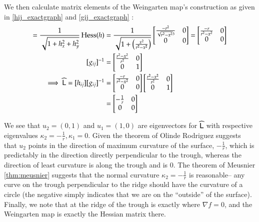   We then calculate matrix elements of the Weingarten map's construction as given in
  \cref{hij_exactgraph} and \cref{gij_exactgraph} :
  \begin{align}
  [h_{ij}] = \frac{1}{\sqrt{1+h_x^2 + h_y^2}} \,  \Hess (h)
     &= \frac{1}{\sqrt{1+\left(\frac{x^2}{r^2-x^2}\right)}}
     \begin{bmatrix}
     \frac{-r^2}{\sqrt{r^2 - x^2}^3} & 0 \\
    0 & 0
     \end{bmatrix} 
     = \begin{bmatrix}
     \frac{-r}{r^2 - x^2} & 0 \\
     0 & 0
     \end{bmatrix} \\
     [g_{ij}]^{-1} &= \begin{bmatrix} \frac{r^2 - x^2}{r^2} & 0 \\ 0 & 1 \end{bmatrix} \\
     \implies \weinmat = [h_{ij}]	[g_{ij}]^{-1} &=
     \begin{bmatrix}
     \frac{-r}{r^2 - x^2} & 0 \\
     0 & 0
     \end{bmatrix} \begin{bmatrix} \frac{r^2 - x^2}{r^2} & 0 \\ 0 & 1 \end{bmatrix} \\
     &= \begin{bmatrix} - \frac{1}{r} & 0 \\ 0 & 0 	\end{bmatrix}	       	
  \end{align}
  
  We see that $u_2 = (0,1)$ and $u_1 = (1,0)$ are eigenvectors for $\widehat{\mathsf{L}}$ with respective eigenvalues
  $\kappa_2 = -\frac{1}{r} , \kappa_1 = 0$. Given the theorem of Olinde Rodriguez suggests that $u_2$ points in the direction of maximum curvature of the surface, $-\frac{1}{r}$, which is predictably in the direction directly perpendicular to the trough, whereas the direction of least curvature is along the trough and is $0$. The theorem of Meusnier \cref{thm:meusnier} suggests that the normal curvature $\kappa_2 = -\frac{1}{r}$ is reasonable-- any curve on the trough perpendicular to the ridge should have the curvature of a circle (the negative simply indicates that we are on the ``outside'' of the surface). Finally, we note that at the ridge of the trough is exactly where $\nabla f = 0$, and the Weingarten map is exactly the Hessian matrix there.
  
